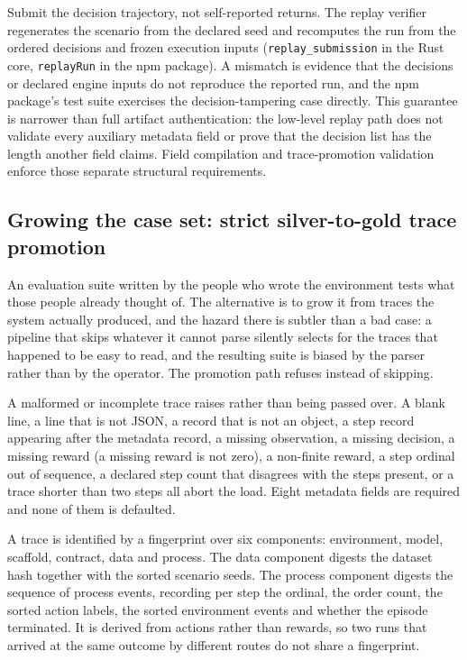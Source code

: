 Submit the decision trajectory, not self-reported returns. The replay verifier regenerates the scenario from the declared seed and recomputes the run from the ordered decisions and frozen execution inputs (\texttt{replay\_submission} in the Rust core, \texttt{replayRun} in the npm package). A mismatch is evidence that the decisions or declared engine inputs do not reproduce the reported run, and the npm package's test suite exercises the decision-tampering case directly. This guarantee is narrower than full artifact authentication: the low-level replay path does not validate every auxiliary metadata field or prove that the decision list has the length another field claims. Field compilation and trace-promotion validation enforce those separate structural requirements.

\subsection{Growing the case set: strict silver-to-gold trace promotion}\label{sec:trace-promotion}

An evaluation suite written by the people who wrote the environment tests what those people already thought of. The alternative is to grow it from traces the system actually produced, and the hazard there is subtler than a bad case: a pipeline that skips whatever it cannot parse silently selects for the traces that happened to be easy to read, and the resulting suite is biased by the parser rather than by the operator. The promotion path refuses instead of skipping.

A malformed or incomplete trace raises rather than being passed over. A blank line, a line that is not JSON, a record that is not an object, a step record appearing after the metadata record, a missing observation, a missing decision, a missing reward (a missing reward is not zero), a non-finite reward, a step ordinal out of sequence, a declared step count that disagrees with the steps present, or a trace shorter than two steps all abort the load. Eight metadata fields are required and none of them is defaulted.

A trace is identified by a fingerprint over six components: environment, model, scaffold, contract, data and process. The data component digests the dataset hash together with the sorted scenario seeds. The process component digests the sequence of process events, recording per step the ordinal, the order count, the sorted action labels, the sorted environment events and whether the episode terminated. It is derived from actions rather than rewards, so two runs that arrived at the same outcome by different routes do not share a fingerprint.

